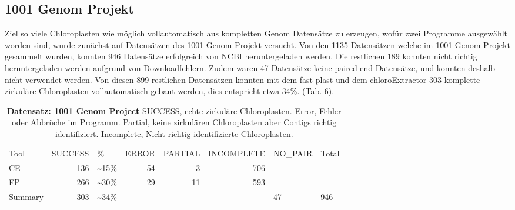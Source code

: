 \documentclass{scrartcl}
\begin{document}
\subsection{1001 Genom Projekt}
\label{sec-4-6}
Ziel so viele Chloroplasten wie möglich vollautomatisch aus kompletten Genom Datensätze zu erzeugen, wofür zwei Programme ausgewählt worden sind, wurde zunächst auf Datensätzen 
des 1001 Genom Projekt versucht.
Von den 1135 Datensätzen welche im 1001 Genom Projekt gesammelt wurden, konnten 946 Datensätze erfolgreich von NCBI heruntergeladen werden. Die restlichen 189 konnten nicht richtig heruntergeladen werden aufgrund von Downloadfehlern. 
Zudem waren 47 Datensätze keine paired end Datensätze, und konnten deshalb nicht verwendet werden. Von diesen 899 restlichen Datensätzen konnten mit dem fast-plast und dem chloroExtractor 303 komplette zirkuläre Chloroplasten 
vollautomatisch gebaut werden, dies entspricht etwa 34\%. (Tab. 6). 
\begin{table}[!h]
\caption[Datensatz: 1001 Genom Project]{\textbf{Datensatz: 1001 Genom Project} SUCCESS, echte zirkuläre Chloroplasten. Error, Fehler oder Abbrüche im Programm. Partial, keine zirkulären Chloroplasten aber Contigs richtig identifiziert. Incomplete, Nicht richtig identifizierte Chloroplasten.}
\begin{center}
\begin{tabular}{lrlrrrll}
Tool & SUCCESS & \% & ERROR & PARTIAL & INCOMPLETE & NO\_PAIR & Total\\
CE & 136 & \textasciitilde{}15\% & 54 & 3 & 706 &  & \\
FP & 266 & \textasciitilde{}30\% & 29 & 11 & 593 &  & \\
Summary & 303 & \textasciitilde{}34\% & - & - & - & 47 & 946\\
\end{tabular}
\end{center}
\end{table}
\end{document}
